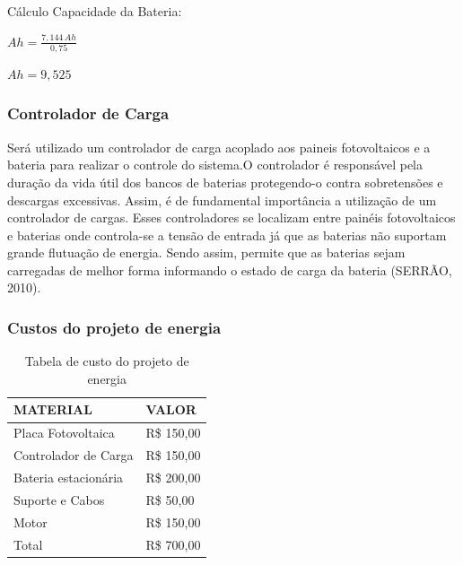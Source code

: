 Cálculo Capacidade da Bateria:

\begin{center}
$Ah=\frac{7,144\,Ah}{0,75}$


$Ah=9,525$
\end{center}

\subsubsection{Controlador de Carga}
Será utilizado um controlador de carga acoplado aos paineis
fotovoltaicos e a bateria para realizar o controle do sistema.O controlador é responsável pela duração da vida útil dos bancos de baterias protegendo-o contra sobretensões e descargas excessivas. Assim, é de fundamental importância a utilização de um controlador de cargas. Esses controladores se localizam entre painéis fotovoltaicos e baterias onde controla-se a tensão de entrada já que as baterias não suportam grande flutuação de energia. Sendo assim, permite que as baterias sejam carregadas de melhor forma informando o estado de carga da bateria (SERRÃO, 2010).

\subsubsection{Custos do projeto de energia}

\begin{table}[H]
\centering
\caption{Tabela de custo do projeto de energia}
\label{custo_energia}
\begin{tabular}{|l|l|}
\hline
MATERIAL             & VALOR      \\ \hline
Placa Fotovoltaica   & R\$ 150,00 \\ \hline
Controlador de Carga & R\$ 150,00 \\ \hline
Bateria estacionária & R\$ 200,00 \\ \hline
Suporte e Cabos      & R\$ 50,00  \\ \hline
Motor                & R\$ 150,00 \\ \hline
Total                & R\$ 700,00 \\ \hline
\end{tabular}
\end{table}
